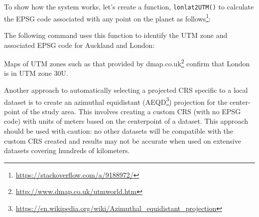 \documentclass[]{krantz}
\newenvironment{Shaded}{\begin{snugshade}}{\end{snugshade}}
\newcommand{\CommentTok}[1]{\textcolor[rgb]{0.37,0.37,0.37}{\textit{#1}}}
\newcommand{\ControlFlowTok}[1]{\textcolor[rgb]{0.27,0.27,0.27}{\textbf{#1}}}
\newcommand{\DecValTok}[1]{\textcolor[rgb]{0.06,0.06,0.06}{#1}}
\newcommand{\FloatTok}[1]{\textcolor[rgb]{0.06,0.06,0.06}{#1}}
\newcommand{\KeywordTok}[1]{\textcolor[rgb]{0.27,0.27,0.27}{\textbf{#1}}}
\newcommand{\NormalTok}[1]{#1}
\newcommand{\OperatorTok}[1]{\textcolor[rgb]{0.43,0.43,0.43}{\textbf{#1}}}
\newcommand{\StringTok}[1]{\textcolor[rgb]{0.5,0.5,0.5}{#1}}
\let\rmarkdownfootnote\footnote%
\def\footnote{\protect\rmarkdownfootnote}
\renewcommand{\href}[2]{#2\footnote{\url{#1}}}
\begin{document}
To show how the system works, let's create a function, \texttt{lonlat2UTM()} to calculate the EPSG code associated with any point on the planet as \href{https://stackoverflow.com/a/9188972/}{follows}:

\begin{Shaded}
\end{Shaded}

The following command uses this function to identify the UTM zone and associated EPSG code for Auckland and London:

\begin{Shaded}
\end{Shaded}

Maps of UTM zones such as that provided by \href{http://www.dmap.co.uk/utmworld.htm}{dmap.co.uk} confirm that London is in UTM zone 30U.

Another approach to automatically selecting a projected CRS specific to a local dataset is to create an azimuthal equidistant (\href{https://en.wikipedia.org/wiki/Azimuthal_equidistant_projection}{AEQD}) projection for the center-point of the study area.
This involves creating a custom CRS (with no EPSG code) with units of meters based on the centerpoint of a dataset.
This approach should be used with caution: no other datasets will be compatible with the custom CRS created and results may not be accurate when used on extensive datasets covering hundreds of kilometers.
\end{document}
